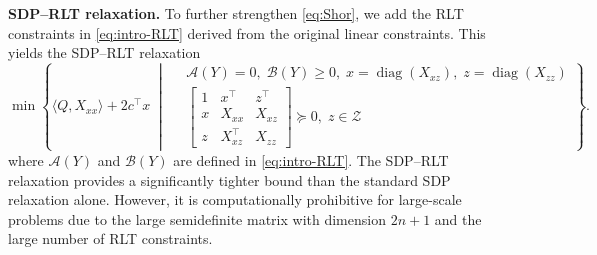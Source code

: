 \documentclass[11pt]{article}
\DeclareMathOperator{\diag}{diag}
\def\A{\mathcal{A}}
\def\B{\mathcal{B}}
\def\Z{\mathcal{Z}}
\def\tb#1{\textbf{#1}}
\theoremstyle{plain}
\begin{document}
\medskip
\noindent\tb{SDP--RLT relaxation.}
To further strengthen \eqref{eq:Shor}, we add the RLT constraints in \eqref{eq:intro-RLT} derived from the original linear constraints. This yields the SDP--RLT relaxation
\begin{equation}\label{eq:Shor-RLT}
\min\left\{
\langle Q,X_{xx} \rangle+2c^\top x  \;\middle|\;
\begin{aligned}
&\A(Y)=0,\; \B(Y)\geq 0,\; x = \diag(X_{xz}),\; z = \diag(X_{zz})\\
& 
\begin{bmatrix}
    1&x^\top & z^\top\\
    x&X_{xx} & X_{xz}\\
    z&X_{xz}^\top & X_{zz}
\end{bmatrix}\succeq 0,\; z\in \Z
\end{aligned}
\right\}.
\end{equation}
where $\A(Y)$ and $\B(Y)$ are defined in \eqref{eq:intro-RLT}.
The SDP--RLT relaxation provides a significantly tighter bound than the standard SDP relaxation alone. However, it is computationally prohibitive for large-scale problems due to the large semidefinite matrix with dimension $2n+1$ and the large number of RLT constraints.
\end{document}
